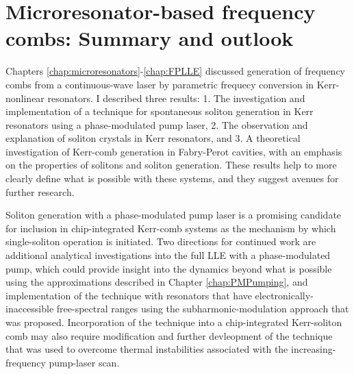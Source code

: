  \chapter{Microresonator-based frequency combs: Summary and outlook}\label{chap:conclusion}

Chapters \ref{chap:microresonators}-\ref{chap:FPLLE} discussed generation of frequency combs from a continuous-wave laser by parametric frequecy conversion in Kerr-nonlinear resonators. I described three results: 1. The investigation and implementation of a technique for spontaneous soliton generation in Kerr resonators using a phase-modulated pump laser, 2. The observation and explanation of soliton crystals in Kerr resonators, and 3. A theoretical investigation of Kerr-comb generation in Fabry-Perot cavities, with an emphasis on the properties of solitons and soliton generation. These results help to more clearly define what is possible with these systems, and they suggest avenues for further research. 

Soliton generation with a phase-modulated pump laser is a promising candidate for inclusion in chip-integrated Kerr-comb systems as the mechanism by which single-soliton operation is initiated. Two directions for continued work are additional analytical investigations into the full LLE with a phase-modulated pump, which could provide insight into the dynamics beyond what is possible using the approximations described in Chapter \ref{chap:PMPumping}, and implementation of the technique with resonators that have electronically-inaccessible free-spectral ranges using the subharmonic-modulation approach that was proposed. Incorporation of the technique into a chip-integrated Kerr-soliton comb may also require modification and further devleopment of the technique that was used to overcome thermal instabilities associated with the increasing-frequency pump-laser scan.

